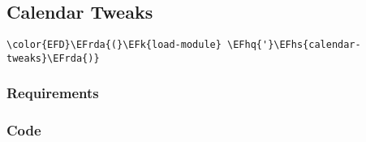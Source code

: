 \documentclass[a4wide,10pt]{article}
\newcommand{\EFk}[1]{\textcolor{EFk}{#1}} %
\newcommand{\EFhq}[1]{\textcolor{EFhq}{#1}} %
\newcommand{\EFhs}[1]{\textcolor{EFhs}{#1}} %
\newcommand{\EFrda}[1]{\textcolor{EFrda}{#1}} %
\begin{document}
\subsection{Calendar Tweaks}
\label{sec:org48a42c0}
\begin{Code}
\begin{Verbatim}
\color{EFD}\EFrda{(}\EFk{load-module} \EFhq{'}\EFhs{calendar-tweaks}\EFrda{)}
\end{Verbatim}
\end{Code}
\subsubsection{Requirements}
\label{sec:orgef8d244}
\subsubsection{Code}
\label{sec:orgcf20393}
\end{document}
